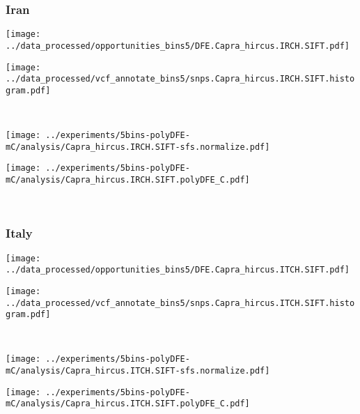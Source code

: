 \subsubsection{Iran}

\begin{minipage}{0.49\linewidth}
    \texttt{[image: ../data\_processed/opportunities\_bins5/DFE.Capra\_hircus.IRCH.SIFT.pdf]}
\end{minipage}
\begin{minipage}{0.49\linewidth}
    \texttt{[image: ../data\_processed/vcf\_annotate\_bins5/snps.Capra\_hircus.IRCH.SIFT.histogram.pdf]}
\end{minipage}
\\
\begin{minipage}{0.49\linewidth}
    \texttt{[image: ../experiments/5bins-polyDFE-mC/analysis/Capra\_hircus.IRCH.SIFT-sfs.normalize.pdf]}
\end{minipage}
\begin{minipage}{0.49\linewidth}
    \texttt{[image: ../experiments/5bins-polyDFE-mC/analysis/Capra\_hircus.IRCH.SIFT.polyDFE\_C.pdf]}
\end{minipage}
\\

\subsubsection{Italy}

\begin{minipage}{0.49\linewidth}
    \texttt{[image: ../data\_processed/opportunities\_bins5/DFE.Capra\_hircus.ITCH.SIFT.pdf]}
\end{minipage}
\begin{minipage}{0.49\linewidth}
    \texttt{[image: ../data\_processed/vcf\_annotate\_bins5/snps.Capra\_hircus.ITCH.SIFT.histogram.pdf]}
\end{minipage}
\\
\begin{minipage}{0.49\linewidth}
    \texttt{[image: ../experiments/5bins-polyDFE-mC/analysis/Capra\_hircus.ITCH.SIFT-sfs.normalize.pdf]}
\end{minipage}
\begin{minipage}{0.49\linewidth}
    \texttt{[image: ../experiments/5bins-polyDFE-mC/analysis/Capra\_hircus.ITCH.SIFT.polyDFE\_C.pdf]}
\end{minipage}
\\

